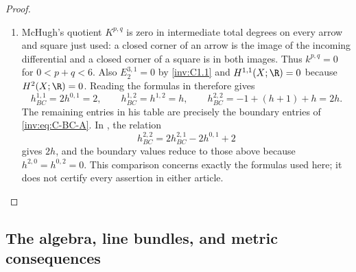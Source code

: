 \begin{proof}
\begin{enumerate}[label=\arabic*.,leftmargin=*]
\item McHugh's quotient $K^{p,q}$ is zero in intermediate total degrees
on every arrow and square just used: a closed corner of an arrow is
the image of the incoming differential and a closed corner of a square
is in both images.  Thus $k^{p,q}=0$ for $0<p+q<6$.
Also $E_2^{3,1}=0$ by \ref{inv:C1.1} and $H^{1,1}(X;\R)=0$ because
$H^2(X;\R)=0$.  Reading the formulas in
\citet[Theorem 6.3, Proposition 6.4, (7), pp. 20--25]{McHugh2018}
therefore gives
\[
h_{BC}^{1,1}=2h^{0,1}=2,\qquad
h_{BC}^{1,2}=h^{1,2}=h,\qquad
h_{BC}^{2,2}=-1+(h+1)+h=2h.
\]
The remaining entries in his table are precisely the boundary entries
of \eqref{inv:eq:C-BC-A}.  In
\citet[Section 4, pp. 13--16]{Angella2018}, the relation
\[
h_{BC}^{2,2}=2h_{BC}^{2,1}-2h^{0,1}+2
\]
gives $2h$, and the boundary values reduce to those above because
$h^{2,0}=h^{0,2}=0$.  This comparison concerns exactly the formulas
used here; it does not certify every assertion in either article.
\end{enumerate}
\end{proof}

\subsection{The algebra, line bundles, and metric consequences}

